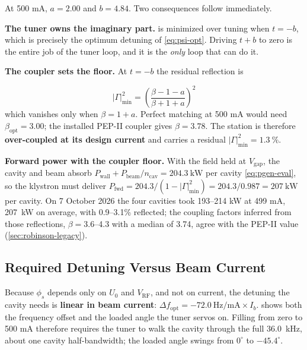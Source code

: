At 500 mA, \(a = 2.00\) and \(b = 4.84\). Two consequences follow immediately.

\textbf{The tuner owns the imaginary part.}  is minimized over tuning when \(t = -b\), which is precisely the optimum detuning of \cref{eq:psi-opt}. Driving \(t+b\) to zero is the entire job of the tuner loop, and it is the \emph{only} loop that can do it.

\textbf{The coupler sets the floor.} At \(t = -b\) the residual reflection is

\begin{equation}\label{eq:gamma-min}
|\Gamma|^2_\text{min} = \left(\frac{\beta - 1 - a}{\beta + 1 + a}\right)^2
\end{equation}
which vanishes only when \(\beta = 1 + a\). Perfect matching at 500 mA would need \(\beta_\text{opt} = 3.00\); the installed PEP-II coupler gives \(\beta = 3.78\). The station is therefore \textbf{over-coupled at its design current} and carries a residual \(|\Gamma|^2_\text{min} = \qty{1.3}{\percent}\).

\begin{keynote}
\textbf{Forward power with the coupler floor.} With the field held at \(V_\text{gap}\), the cavity and beam absorb \(P_\text{wall} + P_\text{beam}/n_\text{cav} = \qty{204.3}{\kilo\watt}\) per cavity \eqref{eq:pgen-eval}, so the klystron must deliver
\(P_\text{fwd} = 204.3/(1-|\Gamma|^2_\text{min}) = 204.3/0.987 = \qty{207}{\kilo\watt}\) per cavity. On 7 October 2026 the four cavities took 193--214 kW at 499 mA, \qty{207}{\kilo\watt} on average, with 0.9--3.1\% reflected; the coupling factors inferred from those reflections, \(\beta = 3.6\)--4.3 with a median of 3.74, agree with the PEP-II value (\cref{sec:robinson-legacy}).
\end{keynote}

\subsection{Required Detuning Versus Beam Current}\label{sec:transient-detuning}


Because \(\phi_s\) depends only on \(U_0\) and \(V_\text{RF}\), and not on current, the detuning the cavity needs is \textbf{linear in beam current}: \(\Delta f_\text{opt} = -\qty{72.0}{\hertz\per\milli\ampere} \times I_b\).  shows both the frequency offset and the loaded angle the tuner servos on. Filling from zero to 500 mA therefore requires the tuner to walk the cavity through the full \qty{36.0}{\kilo\hertz}, about one cavity half-bandwidth; the loaded angle swings from \(0^\circ\) to \(-45.4^\circ\).

